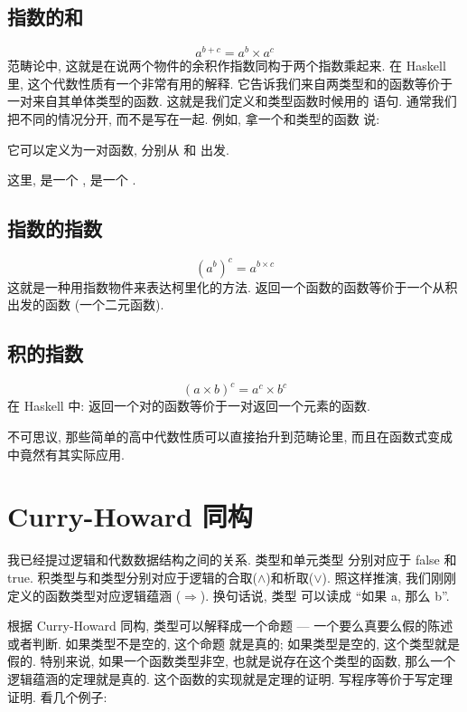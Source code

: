 \subsection{指数的和}

\[a^{b+c} = a^{b} \times a^{c}\]
范畴论中, 这就是在说两个物件的余积作指数同构于两个指数乘起来. 在 Haskell 里, 这个代数性质有一个非常有用的解释.
它告诉我们来自两类型和的函数等价于一对来自其单体类型的函数. 这就是我们定义和类型函数时候用的  语句.
通常我们把不同的情况分开, 而不是写在一起. 例如, 拿一个和类型的函数  说:

它可以定义为一对函数, 分别从  和  出发.

这里,  是一个 ,  是一个 .

\subsection{指数的指数}

\[(a^{b})^{c} = a^{b \times c}\]
这就是一种用指数物件来表达柯里化的方法. 返回一个函数的函数等价于一个从积出发的函数 (一个二元函数).

\subsection{积的指数}

\[(a \times b)^{c} = a^{c} \times b^{c}\]
在 Haskell 中: 返回一个对的函数等价于一对返回一个元素的函数.

不可思议, 那些简单的高中代数性质可以直接抬升到范畴论里, 而且在函数式变成中竟然有其实际应用.

\section{Curry-Howard 同构}

我已经提过逻辑和代数数据结构之间的关系.  类型和单元类型 \code{()} 分别对应于 false 和 true.
积类型与和类型分别对应于逻辑的合取($\wedge$)和析取($\vee$). 照这样推演, 我们刚刚定义的函数类型对应逻辑蕴涵
($\Rightarrow$). 换句话说, 类型  可以读成 ``如果 a, 那么 b''.

根据 Curry-Howard 同构, 类型可以解释成一个命题 --- 一个要么真要么假的陈述或者判断. 如果类型不是空的, 这个命题
就是真的; 如果类型是空的, 这个类型就是假的. 特别来说, 如果一个函数类型非空, 也就是说存在这个类型的函数, 那么一个
逻辑蕴涵的定理就是真的. 这个函数的实现就是定理的证明. 写程序等价于写定理证明. 看几个例子:

